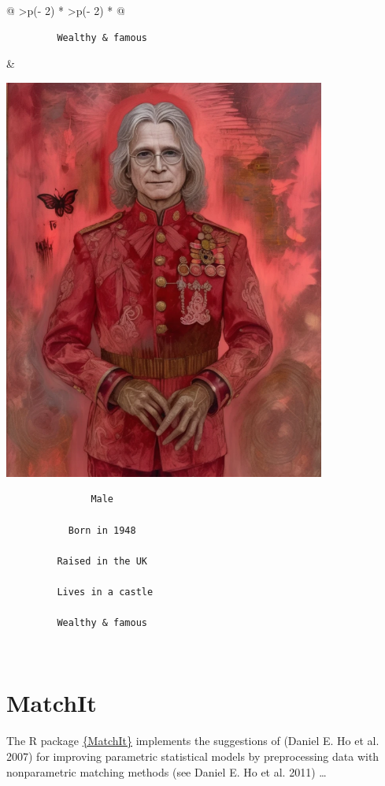 \documentclass[
  letterpaper,
  DIV=11,
  numbers=noendperiod]{scrreprt}
\begin{document}
\begin{longtable}[]{@{}
  >{\centering\arraybackslash}p{(\columnwidth - 2\tabcolsep) * }
  >{\centering\arraybackslash}p{(\columnwidth - 2\tabcolsep) * }@{}}
\begin{minipage}[t]{\linewidth}
\begin{verbatim}
         Wealthy & famous
\end{verbatim}
\end{minipage} & \begin{minipage}[t]{\linewidth}\centering
\includegraphics[width=\textwidth,height=5.20833in]{img/ozzy.png}

\begin{verbatim}
               Male

           Born in 1948

         Raised in the UK

         Lives in a castle

         Wealthy & famous
\end{verbatim}
\end{minipage} \\
\end{longtable}

\section{MatchIt}\label{matchit}

The R package \href{https://kosukeimai.github.io/MatchIt/}{\{MatchIt\}}
implements the suggestions of (Daniel E. Ho et al. 2007) for improving
parametric statistical models by preprocessing data with nonparametric
matching methods (see Daniel E. Ho et al. 2011) \ldots{}
\end{document}

